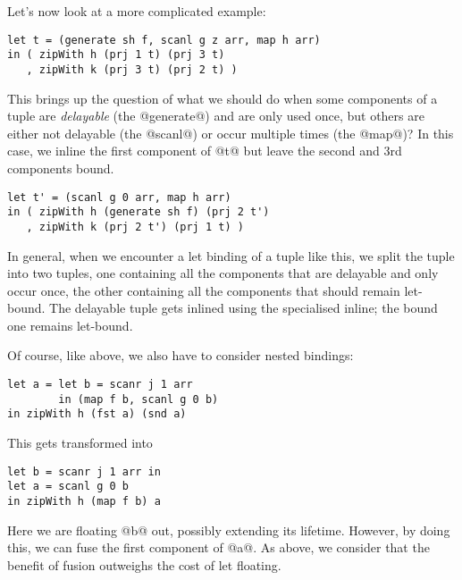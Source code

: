 Let's now look at a more complicated example:
%
\begin{lstlisting}
let t = (generate sh f, scanl g z arr, map h arr)
in ( zipWith h (prj 1 t) (prj 3 t)
   , zipWith k (prj 3 t) (prj 2 t) )
\end{lstlisting}
%
This brings up the question of what we should do when some components of a tuple are \emph{delayable} (the @generate@) and are only used once, but others are either not delayable (the @scanl@) or occur multiple times (the @map@)? In this case, we inline the first component of @t@ but leave the second and 3rd components bound.
%
\begin{lstlisting}
let t' = (scanl g 0 arr, map h arr)
in ( zipWith h (generate sh f) (prj 2 t')
   , zipWith k (prj 2 t') (prj 1 t) )
\end{lstlisting}
%
In general, when we encounter a let binding of a tuple like this, we split the tuple into two tuples, one containing all the components that are delayable and only occur once, the other containing all the components that should remain let-bound. The delayable tuple gets inlined using the specialised inline; the bound one remains let-bound.

Of course, like above, we also have to consider nested bindings:
%
\begin{lstlisting}
let a = let b = scanr j 1 arr
        in (map f b, scanl g 0 b)
in zipWith h (fst a) (snd a)
\end{lstlisting}
%
This gets transformed into
%
\begin{lstlisting}
let b = scanr j 1 arr in
let a = scanl g 0 b
in zipWith h (map f b) a
\end{lstlisting}
%
Here we are floating @b@ out, possibly extending its lifetime. However, by doing this, we can fuse the first component of @a@. As above, we consider that the benefit of fusion outweighs the cost of let floating.


